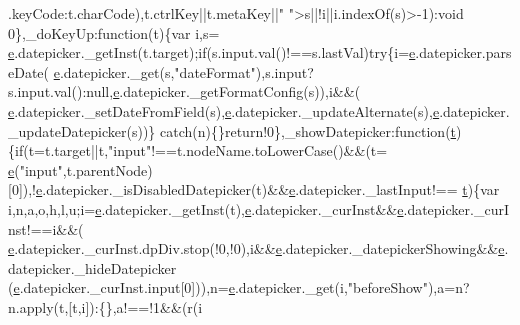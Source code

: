 \begin{DoxyCode}
      .keyCode:t.charCode),t.ctrlKey||t.metaKey||\textcolor{stringliteral}{" "}>s||!i||i.indexOf(s)>-1):\textcolor{keywordtype}{void} 0\},\_doKeyUp:\textcolor{keyword}{function}(t)\{var i,s=
      \hyperlink{jquery-ui_8min_8js_a2c038346d47955cbe2cb91e338edd7e1}{e}.datepicker.\_getInst(t.target);\textcolor{keywordflow}{if}(s.input.val()!==s.lastVal)\textcolor{keywordflow}{try}\{i=\hyperlink{jquery-ui_8min_8js_a2c038346d47955cbe2cb91e338edd7e1}{e}.datepicker.parseDate(
      \hyperlink{jquery-ui_8min_8js_a2c038346d47955cbe2cb91e338edd7e1}{e}.datepicker.\_get(s,\textcolor{stringliteral}{"dateFormat"}),s.input?s.input.val():null,\hyperlink{jquery-ui_8min_8js_a2c038346d47955cbe2cb91e338edd7e1}{e}.datepicker.\_getFormatConfig(s)),i&&(
      \hyperlink{jquery-ui_8min_8js_a2c038346d47955cbe2cb91e338edd7e1}{e}.datepicker.\_setDateFromField(s),\hyperlink{jquery-ui_8min_8js_a2c038346d47955cbe2cb91e338edd7e1}{e}.datepicker.\_updateAlternate(s),\hyperlink{jquery-ui_8min_8js_a2c038346d47955cbe2cb91e338edd7e1}{e}.datepicker.\_updateDatepicker(s))\}\textcolor{keywordflow}{
      catch}(n)\{\}\textcolor{keywordflow}{return}!0\},\_showDatepicker:\textcolor{keyword}{function}(\hyperlink{jquery-2_80_83_8min_8js_aaccc9105df5383111407fd5b41255e23}{t})\{\textcolor{keywordflow}{if}(t=t.target||t,\textcolor{stringliteral}{"input"}!==t.nodeName.toLowerCase()&&(t=
      \hyperlink{jquery-ui_8min_8js_a2c038346d47955cbe2cb91e338edd7e1}{e}(\textcolor{stringliteral}{"input"},t.parentNode)[0]),!\hyperlink{jquery-ui_8min_8js_a2c038346d47955cbe2cb91e338edd7e1}{e}.datepicker.\_isDisabledDatepicker(t)&&\hyperlink{jquery-ui_8min_8js_a2c038346d47955cbe2cb91e338edd7e1}{e}.datepicker.\_lastInput!==
      \hyperlink{jquery-2_80_83_8min_8js_aaccc9105df5383111407fd5b41255e23}{t})\{var i,n,a,o,h,l,u;i=\hyperlink{jquery-ui_8min_8js_a2c038346d47955cbe2cb91e338edd7e1}{e}.datepicker.\_getInst(t),\hyperlink{jquery-ui_8min_8js_a2c038346d47955cbe2cb91e338edd7e1}{e}.datepicker.\_curInst&&\hyperlink{jquery-ui_8min_8js_a2c038346d47955cbe2cb91e338edd7e1}{e}.datepicker.\_curInst!==i&&(
      \hyperlink{jquery-ui_8min_8js_a2c038346d47955cbe2cb91e338edd7e1}{e}.datepicker.\_curInst.dpDiv.stop(!0,!0),i&&\hyperlink{jquery-ui_8min_8js_a2c038346d47955cbe2cb91e338edd7e1}{e}.datepicker.\_datepickerShowing&&\hyperlink{jquery-ui_8min_8js_a2c038346d47955cbe2cb91e338edd7e1}{e}.datepicker.\_hideDatepicker
      (\hyperlink{jquery-ui_8min_8js_a2c038346d47955cbe2cb91e338edd7e1}{e}.datepicker.\_curInst.input[0])),n=\hyperlink{jquery-ui_8min_8js_a2c038346d47955cbe2cb91e338edd7e1}{e}.datepicker.\_get(i,\textcolor{stringliteral}{"beforeShow"}),a=n?n.apply(t,[t,i]):\{\},a!==!1&&(r(i

\end{DoxyCode}
